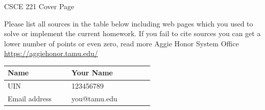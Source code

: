 \documentclass[english]{article}
\begin{document}

\begin{centering}
    {\Large CSCE 221 Cover Page} \\ \medskip    
\end{centering}

Please list all sources in the table below including web pages which you used to solve or implement the current homework. If you fail to cite sources you can get a lower number of points or even zero, read more Aggie Honor System Office \url{https://aggiehonor.tamu.edu/} \\

\noindent
\begin{center}
    {\large
    \begin{tabular}{|p{0.35\linewidth}|p{0.45\linewidth}|} \hline
        Name          & Your Name         \\ \hline
        UIN           & 123456789         \\ \hline
        Email address & you@tamu.edu      \\ \hline
    \end{tabular}
    }
\end{center}
\end{document}
